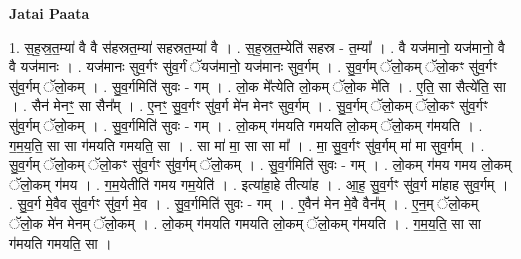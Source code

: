 \documentclass[17pt]{extarticle}
\begin{document}
\textbf{Jatai Paata} \newline

1. स॒ह॒स्र॒त॒म्या॑ वै वै स॑हस्रत॒म्या॑ सहस्रत॒म्या॑ वै । . स॒ह॒स्र॒त॒म्येति॑ सहस्र - त॒म्या᳚ । . वै यज॑मानो॒ यज॑मानो॒ वै वै यज॑मानः । . यज॑मानः सुव॒र्गꣳ सु॑व॒र्गं ॅयज॑मानो॒ यज॑मानः सुव॒र्गम् । . सु॒व॒र्गम् ॅलो॒कम् ॅलो॒कꣳ सु॑व॒र्गꣳ सु॑व॒र्गम् ॅलो॒कम् । . सु॒व॒र्गमिति॑ सुवः - गम् । . लो॒क मे᳚त्येति लो॒कम् ॅलो॒क मे॑ति । . ए॒ति॒ सा सैत्ये॑ति॒ सा । . सैन॑ मेनꣳ॒॒ सा सैन᳚म् । . ए॒नꣳ॒॒ सु॒व॒र्गꣳ सु॑व॒र्ग मे॑न मेनꣳ सुव॒र्गम् । . सु॒व॒र्गम् ॅलो॒कम् ॅलो॒कꣳ सु॑व॒र्गꣳ सु॑व॒र्गम् ॅलो॒कम् । . सु॒व॒र्गमिति॑ सुवः - गम् । . लो॒कम् ग॑मयति गमयति लो॒कम् ॅलो॒कम् ग॑मयति । . ग॒म॒य॒ति॒ सा सा ग॑मयति गमयति॒ सा । . सा मा॑ मा॒ सा सा मा᳚ । . मा॒ सु॒व॒र्गꣳ सु॑व॒र्गम् मा॑ मा सुव॒र्गम् । . सु॒व॒र्गम् ॅलो॒कम् ॅलो॒कꣳ सु॑व॒र्गꣳ सु॑व॒र्गम् ॅलो॒कम् । . सु॒व॒र्गमिति॑ सुवः - गम् । . लो॒कम् ग॑मय गमय लो॒कम् ॅलो॒कम् ग॑मय । . ग॒म॒येतीति॑ गमय गम॒येति॑ । . इत्या॑हा॒हे तीत्या॑ह । . आ॒ह॒ सु॒व॒र्गꣳ सु॑व॒र्ग मा॑हाह सुव॒र्गम् । . सु॒व॒र्ग मे॒वैव सु॑व॒र्गꣳ सु॑व॒र्ग मे॒व । . सु॒व॒र्गमिति॑ सुवः - गम् । . ए॒वैन॑ मेन मे॒वै वैन᳚म् । . ए॒न॒म् ॅलो॒कम् ॅलो॒क मे॑न मेनम् ॅलो॒कम् । . लो॒कम् ग॑मयति गमयति लो॒कम् ॅलो॒कम् ग॑मयति । . ग॒म॒य॒ति॒ सा सा ग॑मयति गमयति॒ सा । \newline
\end{document}
